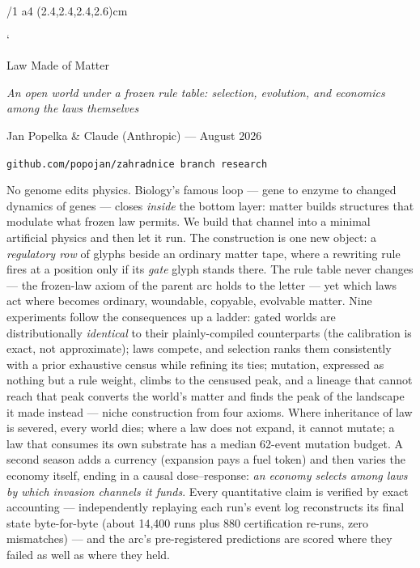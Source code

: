 \fontfam[Equity]
\hyperlinks \Blue \Blue
\report
\margins/1 a4 (2.4,2.4,2.4,2.6)cm
\typosize[11/13.8]
\raggedbottom

\def\repo#1{{\tt #1}}
\def\lawname#1{{\bf #1.}}
\def\g#1{{\tt #1}}
\def\sqr{\sqcup}
\def\la{$\alpha$}
\def\lb{$\beta$}
\def\lc{$\gamma$}
\def\ld{$\delta$}
\def\lnull{$\beta'$}
\verbchar`

\tit Law Made of Matter

\centerline{\it An open world under a frozen rule table: selection,
evolution, and economics among the laws themselves}
\medskip
\centerline{Jan Popelka \& Claude (Anthropic) --- August 2026}
\centerline{\tt github.com/popojan/zahradnice \quad branch {\tt research}
\quad \repo{experiments/openworld/}}
\bigskip

No genome edits physics. Biology's famous loop --- gene to enzyme to
changed dynamics of genes --- closes {\it inside} the bottom layer:
matter builds structures that modulate what frozen law permits.
We build that channel into a minimal artificial physics and then
let it run. The construction is one new object: a {\it regulatory
row} of glyphs beside an ordinary matter tape, where a rewriting
rule fires at a position only if its {\it gate} glyph stands there.
The rule table never changes --- the frozen-law axiom of the parent
arc holds to the letter --- yet which laws act where becomes
ordinary, woundable, copyable, evolvable matter. Nine experiments
follow the consequences up a ladder: gated worlds are
distributionally {\it identical} to their plainly-compiled
counterparts (the calibration is exact, not approximate); laws
compete, and selection ranks them consistently with a prior
exhaustive census while refining its ties; mutation, expressed as
nothing but a rule weight, climbs to the censused peak, and a
lineage that cannot reach that peak converts the world's matter and
finds the peak of the landscape it made instead --- niche
construction from four axioms. Where inheritance of law is
severed, every world dies; where a law does not expand, it cannot
mutate; a law that consumes its own substrate has a median 62-event
mutation budget. A second season adds a currency (expansion pays a
fuel token) and then varies the economy itself, ending in a causal
dose--response: {\it an economy selects among laws by which
invasion channels it funds}. Every quantitative claim is verified
by exact accounting --- independently replaying each run's event
log reconstructs its final state byte-for-byte (about 14{,}400
runs plus 880 certification re-runs, zero mismatches) --- and the arc's pre-registered predictions
are scored where they failed as well as where they held.

